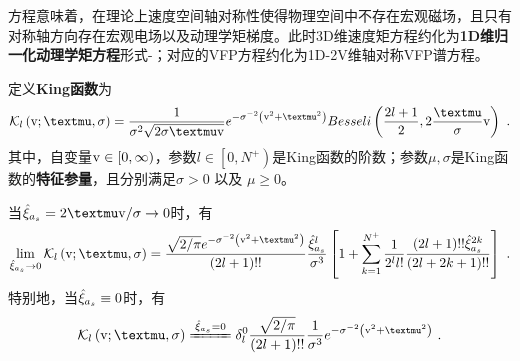   方程意味着，在理论上速度空间轴对称性使得物理空间中不存在宏观磁场，且只有对称轴方向存在宏观电场以及动理学矩梯度。此时3D维速度矩方程约化为\textbf{1D维归一化动理学矩方程}形式-；对应的VFP方程约化为1D-2V维轴对称VFP谱方程。
  
  \begin{definition} \label{定义-King函数}
      定义\textbf{King函数}为
      \begin{eqnarray}
        \Kl \left(\rmv;\mu,\sigma \right) = \frac{1}{\sigma^2 \sqrt{2 \sigma \mu \rmv}} e^{-\sigma^{-2} \left (\rmv^2 + \mu^2  \right)} Besseli \left(\frac{2l+1}{2}, 2 \frac{\mu}{\sigma} \rmv \right) ~.  \label{King}
      \end{eqnarray}
      其中，自变量$\mathrm{v}\in \left [0,\infty \right)$，参数$l \in \left [0,N^+ \right)$是King函数的阶数；参数$\mu,\sigma$是King函数的\textbf{特征参量}，且分别满足$\sigma > 0$ 以及 $\mu \ge 0$。
  \end{definition}
当$\xihas=2\mu \rmv / \sigma \to 0$时，有
\begin{eqnarray}
    \lim_{\xihas \to 0} \Kl \left(\rmv;\mu,\sigma \right) = \frac{\sqrt{2/\pi}  e^{-\sigma^{-2} \left (\rmv^2 + \mu^2  \right)}}{(2 l + 1)!!} \frac{\xihas^l}{\sigma^3} \left [1 + \sum_{k=1}^{N^+} \frac{1}{2^l l!} \frac{(2 l + 1)!! \xihas^{2k}}{(2 l + 2 k + 1)!!} \right] ~.  \label{Kingxi}
\end{eqnarray}
特别地，当$\hat{\xi}_{a_s} \equiv 0$时，有
\begin{eqnarray}
    \Kl \left(\rmv;\mu,\sigma \right) \xlongequal[]{\xihas = 0} \delta_l^0 \frac{\sqrt{2/\pi}}{(2 l + 1)!!} \frac{1}{\sigma^3}  e^{-\sigma^{-2} \left (\rmv^2 + \mu^2  \right)} ~.  \label{Kingxi0}
\end{eqnarray}
  
